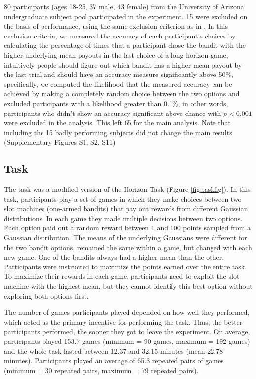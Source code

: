 \documentclass[12pt]{article}
\begin{document}
{80 participants (ages 18-25, 37 male, 43 female) from the University of Arizona undergraduate subject pool participated in the experiment. 15 were excluded on the basis of performance, using the same exclusion criterion as in \cite{wilson2014}. In this exclusion criteria, we measured the accuracy of each participant's choices by calculating the percentage of times that a participant chose the bandit with the higher underlying mean payouts in the last choice of a long horizon game, intuitively people should figure out which bandit has a higher mean payout by the last trial and should have an accuracy measure significantly above 50\%, specifically, we computed the likelihood that the measured accuracy can be achieved by making a completely random choice between the two options and excluded participants with a likelihood greater than 0.1\%, in other words, participants who didn't show an accuracy significant above chance with $p < 0.001$ were excluded in the analysis. This left 65 for the main analysis. Note that including the 15 badly performing subjects did not change the main results (Supplementary Figures S1, S2, S11)

\subsection*{Task}
The task was a modified version of the Horizon Task \citep{wilson2014} (Figure \ref{fig:taskfig}). In this task, participants play a set of games in which they make choices between two slot machines (one-armed bandits) that pay out rewards from different Gaussian distributions. In each game they made multiple decisions between two options. Each option paid out a random reward between 1 and 100 points sampled from a Gaussian distribution. The means of the underlying Gaussians were different for the two bandit options, remained the same within a game, but changed with each new game. One of the bandits always had a higher mean than the other. Participants were instructed to maximize the points earned over the entire task. To maximize their rewards in each game, participants need to exploit the slot machine with the highest mean, but they cannot identify this best option without exploring both options first. 

The number of games participants played depended on how well they performed, which acted as the primary incentive for performing the task. Thus, the better participants performed, the sooner they got to leave the experiment. On average, participants played 153.7 games (minimum = 90 games, maximum = 192 games) and the whole task lasted between 12.37 and 32.15 minutes (mean 22.78 minutes). Participants played an average of 65.3 repeated pairs of games (minimum = 30 repeated pairs, maximum =  79 repeated pairs).

}
\end{document}
